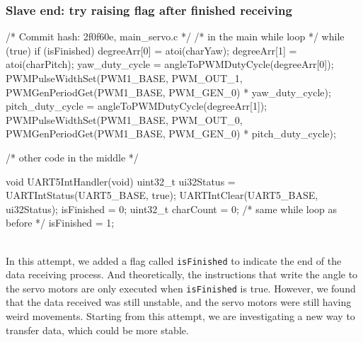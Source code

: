 \documentclass[12pt, a4paper]{article}
\begin{document}
\subsubsection{Slave end: try raising flag after finished receiving}\text{}
\begin{code}
/* Commit hash: 2f0f60e, main_servo.c */
/* in the main while loop */
while (true) {
    if (isFinished) {
        degreeArr[0] = atoi(charYaw);
        degreeArr[1] = atoi(charPitch);
        yaw_duty_cycle = angleToPWMDutyCycle(degreeArr[0]);
        PWMPulseWidthSet(PWM1_BASE, PWM_OUT_1, PWMGenPeriodGet(PWM1_BASE, PWM_GEN_0) * yaw_duty_cycle);
        pitch_duty_cycle = angleToPWMDutyCycle(degreeArr[1]);
        PWMPulseWidthSet(PWM1_BASE, PWM_OUT_0, PWMGenPeriodGet(PWM1_BASE, PWM_GEN_0) * pitch_duty_cycle);
    }
}

/* other code in the middle */

void UART5IntHandler(void) {
    uint32_t ui32Status = UARTIntStatus(UART5_BASE, true);
    UARTIntClear(UART5_BASE, ui32Status);
    isFinished = 0;
    uint32_t charCount = 0;
    /* same while loop as before */
    isFinished = 1;
}
\end{code}\text{}\\
In this attempt, we added a flag called \texttt{isFinished} to indicate the end of the data receiving process. 
And theoretically, the instructions that write the angle to the servo motors are only executed when \texttt{isFinished} is true.
However, we found that the data received was still unstable, and the servo motors were still having weird movements.
Starting from this attempt, we are investigating a new way to transfer data, which could be more stable. 
\end{document}
